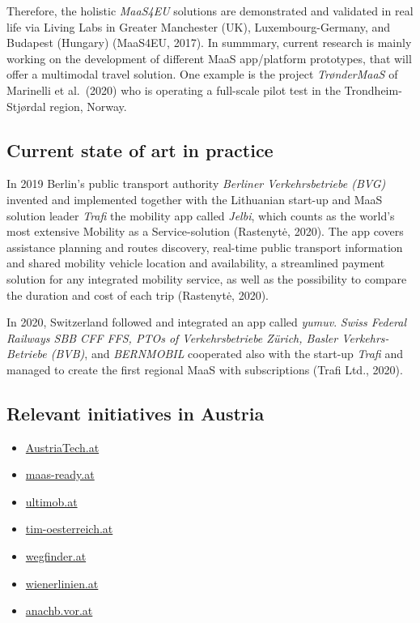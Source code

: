 \documentclass[
]{book}
\providecommand{\tightlist}{%
  \setlength{\itemsep}{0pt}\setlength{\parskip}{0pt}}
\begin{document}
Therefore, the holistic \emph{MaaS4EU} solutions are demonstrated and validated in real life via Living Labs in Greater Manchester (UK), Luxembourg-Germany, and Budapest (Hungary) (MaaS4EU, 2017). In summmary, current research is mainly working on the development of different MaaS app/platform prototypes, that will offer a multimodal travel solution. One example is the project \emph{TrønderMaaS} of Marinelli et al.~(2020) who is operating a full-scale pilot test in the Trondheim-Stjørdal region, Norway.

\hypertarget{current-state-of-art-in-practice-16}{%
\subsection*{Current state of art in practice}\label{current-state-of-art-in-practice-16}}

In 2019 Berlin's public transport authority \emph{Berliner Verkehrsbetriebe (BVG)} invented and implemented together with the Lithuanian start-up and MaaS solution leader \emph{Trafi} the mobility app called \emph{Jelbi}, which counts as the world's most extensive Mobility as a Service-solution (Rastenytė, 2020). The app covers assistance planning and routes discovery, real-time public transport information and shared mobility vehicle location and availability, a streamlined payment solution for any integrated mobility service, as well as the possibility to compare the duration and cost of each trip (Rastenytė, 2020).

In 2020, Switzerland followed and integrated an app called \emph{yumuv}. \emph{Swiss Federal Railways SBB CFF FFS, PTOs of Verkehrsbetriebe Zürich, Basler Verkehrs-Betriebe (BVB)}, and \emph{BERNMOBIL} cooperated also with the start-up \emph{Trafi} and managed to create the first regional MaaS with subscriptions (Trafi Ltd., 2020).

\hypertarget{relevant-initiatives-in-austria-16}{%
\subsection*{Relevant initiatives in Austria}\label{relevant-initiatives-in-austria-16}}

\begin{itemize}
\tightlist
\item
  \href{https://www.austriatech.at/assets/Uploads/Publikationen/PDF-Dateien/29fc02ada2/MaaS-miA_english_102019_web.pdf}{AustriaTech.at}
\item
  \href{https://maas-ready.at}{maas-ready.at}
\item
  \href{https://www.ultimob.at}{ultimob.at}
\item
  \href{https://www.tim-oesterreich.at/graz/}{tim-oesterreich.at}
\item
  \href{https://wegfinder.at/}{wegfinder.at}
\item
  \href{https://www.wienerlinien.at/eportal3/ep/channelView.do/pageTypeId/66526/channelId/-3600060}{wienerlinien.at}
\item
  \href{https://anachb.vor.at/}{anachb.vor.at}
\end{itemize}
\end{document}
